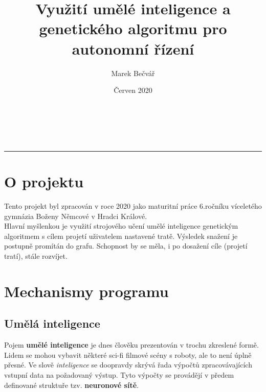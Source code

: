 \documentclass[a4paper,12pt]{article}
\title{Využití umělé inteligence a genetického algoritmu pro autonomní řízení}
\author{Marek Bečvář}
\date{Červen 2020}
\renewcommand{\maketitle}
{
    \begin{center}
        \vspace*{0cm}
        \LARGE{\textbf{\thetitle}}\\
        \vspace{0.5cm}
        \Large{\textbf{\theauthor}}\\
        \vspace{0.5cm}
        \normalsize{\thedate}
        \vspace{0.2cm}
        \hrule
    \end{center}
}
\newcommand{\tab}
{
    \hspace*{1em}
}
\begin{document}
    \maketitle

    \vspace{0.25cm}
    \section{O projektu}
        \tab Tento projekt byl zpracován v roce 2020 jako maturitní práce 6.ročníku 
        víceletého gymnázia Boženy Němcové v Hradci Králové.\\
        \tab Hlavní myšlenkou je využití strojového učení umělé inteligence genetickým 
        algoritmem s cílem projetí uživatelem nastavené tratě. Výsledek snažení 
        je postupně promítán do grafu. Schopnost by se měla, i po dosažení cíle (projetí tratí),
        stále rozvíjet.

    \section{Mechanismy programu}
    \subsection{Umělá inteligence}
        Pojem \textbf{umělé inteligence} je dnes člověku prezentován v trochu zkreslené formě.
        Lidem se mohou vybavit některé sci-fi filmové scény s roboty, ale to není úplně přesné.
        Ve slově \textit{inteligence} se doopravdy skrývá řada výpočtů zpracovávajících \\vstupní data 
        na požadovaný výstup. Tyto výpočty se provádějí v předem definované 
        struktuře tzv. \textbf{neuronové sítě}.\\
            
\end{document}
